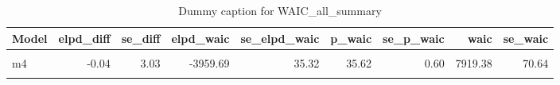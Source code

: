 \begin{table}
\centering
\caption{Dummy caption for WAIC_all_summary}
\centering
\fontsize{10}{12}\selectfont
\begin{tabular}[t]{lrrrrrrrr}
\toprule
Model & elpd\_diff & se\_diff & elpd\_waic & se\_elpd\_waic & p\_waic & se\_p\_waic & waic & se\_waic\\
\midrule
\cellcolor{gray!10}{m3.1} & \cellcolor{gray!10}{0.00} & \cellcolor{gray!10}{0.00} & \cellcolor{gray!10}{-3959.65} & \cellcolor{gray!10}{35.29} & \cellcolor{gray!10}{31.07} & \cellcolor{gray!10}{0.50} & \cellcolor{gray!10}{7919.31} & \cellcolor{gray!10}{70.59}\\
m4 & -0.04 & 3.03 & -3959.69 & 35.32 & 35.62 & 0.60 & 7919.38 & 70.64\\
\cellcolor{gray!10}{m2} & \cellcolor{gray!10}{-0.05} & \cellcolor{gray!10}{0.12} & \cellcolor{gray!10}{-3959.70} & \cellcolor{gray!10}{35.28} & \cellcolor{gray!10}{31.11} & \cellcolor{gray!10}{0.51} & \cellcolor{gray!10}{7919.41} & \cellcolor{gray!10}{70.57}\\
\bottomrule
\end{tabular}
\end{table}
